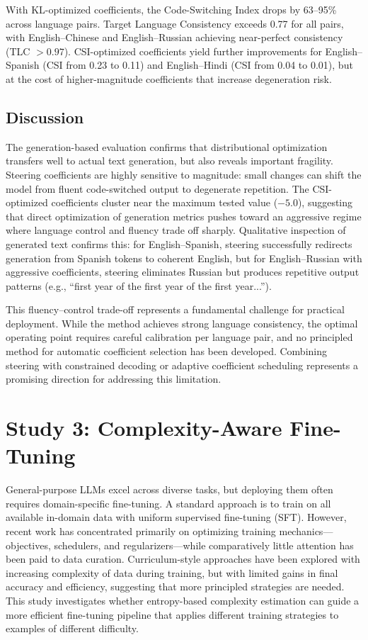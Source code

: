 With KL-optimized coefficients, the Code-Switching Index drops by 63--95\% across language pairs. Target Language Consistency exceeds 0.77 for all pairs, with English--Chinese and English--Russian achieving near-perfect consistency (TLC $> 0.97$). CSI-optimized coefficients yield further improvements for English--Spanish (CSI from 0.23 to 0.11) and English--Hindi (CSI from 0.04 to 0.01), but at the cost of higher-magnitude coefficients that increase degeneration risk.

\subsection{Discussion}

The generation-based evaluation confirms that distributional optimization transfers well to actual text generation, but also reveals important fragility. Steering coefficients are highly sensitive to magnitude: small changes can shift the model from fluent code-switched output to degenerate repetition. The CSI-optimized coefficients cluster near the maximum tested value ($-5.0$), suggesting that direct optimization of generation metrics pushes toward an aggressive regime where language control and fluency trade off sharply. Qualitative inspection of generated text confirms this: for English--Spanish, steering successfully redirects generation from Spanish tokens to coherent English, but for English--Russian with aggressive coefficients, steering eliminates Russian but produces repetitive output patterns (e.g., ``first year of the first year of the first year...'').

This fluency--control trade-off represents a fundamental challenge for practical deployment. While the method achieves strong language consistency, the optimal operating point requires careful calibration per language pair, and no principled method for automatic coefficient selection has been developed. Combining steering with constrained decoding or adaptive coefficient scheduling represents a promising direction for addressing this limitation.

\section{Study 3: Complexity-Aware Fine-Tuning}

General-purpose LLMs excel across diverse tasks, but deploying them often requires domain-specific fine-tuning. A standard approach is to train on all available in-domain data with uniform supervised fine-tuning (SFT). However, recent work has concentrated primarily on optimizing training mechanics---objectives, schedulers, and regularizers---while comparatively little attention has been paid to data curation. Curriculum-style approaches have been explored with increasing complexity of data during training, but with limited gains in final accuracy and efficiency, suggesting that more principled strategies are needed. This study investigates whether entropy-based complexity estimation can guide a more efficient fine-tuning pipeline that applies different training strategies to examples of different difficulty.

